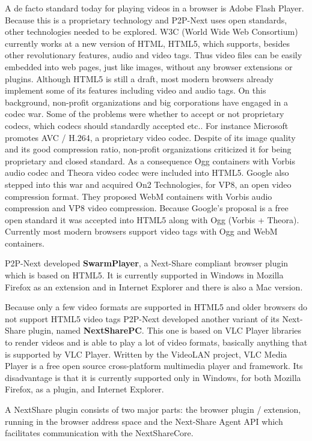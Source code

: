 A de facto standard today for playing videos in a browser is Adobe Flash Player. Because this is a proprietary technology and P2P-Next uses open standards, other technologies needed to be explored. W3C (World Wide Web Consortium) currently works at a new version of HTML, HTML5, which supports, besides other revolutionary features, audio and video tags. Thus video files can be easily embedded into web pages, just like images, without any browser extensions or plugins. Although HTML5 is still a draft, most modern browsers already implement some of its features including video and audio tags. On this background, non-profit organizations and big corporations have engaged in a codec war. Some of the problems were whether to accept or not proprietary codecs, which codecs should standardly accepted etc.. For instance Microsoft promotes AVC / H.264, a proprietary video codec. Despite of its image quality and its good compression ratio, non-profit organizations criticized it for being proprietary and closed standard. As a consequence Ogg containers with Vorbis audio codec and Theora video codec were included into HTML5. Google also stepped into this war and acquired On2 Technologies, for VP8, an open video compression format. They proposed WebM containers with Vorbis audio compression and VP8 video compression. Because Google's proposal is a free open standard it was accepted into HTML5 along with Ogg (Vorbis + Theora). Currently most modern browsers support video tags with Ogg and WebM containers.

P2P-Next developed \textbf{SwarmPlayer}, a Next-Share compliant browser plugin which is based on HTML5. It is currently supported in Windows in Mozilla Firefox as an extension and in Internet Explorer and there is also a Mac version.

Because only a few video formats are supported in HTML5 and older browsers do not support HTML5 video tags P2P-Next developed another variant of its Next-Share plugin, named \textbf{NextSharePC}. This one is based on VLC Player libraries to render videos and is able to play a lot of video formats, basically anything that is supported by VLC Player. Written by the VideoLAN project, VLC Media Player is a free open source cross-platform multimedia player and framework. Its disadvantage is that it is currently supported only in Windows, for both Mozilla Firefox, as a plugin, and Internet Explorer.

A NextShare plugin consists of two major parts: the browser plugin / extension, running in the browser address space and the Next-Share Agent API which facilitates communication with the NextShareCore.